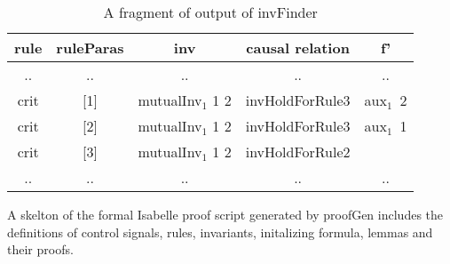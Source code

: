 \documentclass{llncs}
\begin{document}
 \begin{table}[!t]
\centering \caption{A fragment of output of {\sf invFinder}}\label{label-ground-causal relation} %
\begin{tabular}{|c|c|c|c|c|  }
\hline
  rule& ruleParas&inv&causal relation &   f'  \\
\hline
  .. & ..&.. &..&.. \\

\hline
  crit  & [1]& mutualInv$_1$ 1 2& invHoldForRule3 &aux$_1$~2 \\
\hline
  crit &[2]& mutualInv$_1$ 1 2& invHoldForRule3 &aux$_1$~1  \\
\hline
  crit & [3]& mutualInv$_1$ 1 2 & invHoldForRule2  & \\
\hline
  .. & ..&.. &..&.. \\
\hline
\end{tabular}
\end{table}

A skelton of the formal Isabelle proof script generated by {\sf proofGen} 
includes the definitions of control signals, rules, invariants, initalizing formula,  
lemmas and their proofs. %
\end{document}
